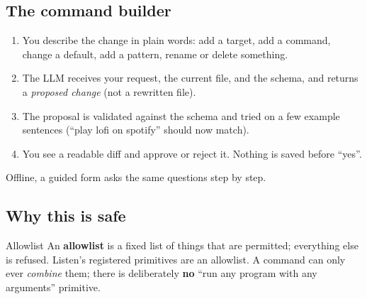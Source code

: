 \documentclass[11pt,a4paper]{article}
\begin{document}
\subsection{The command builder}
\begin{center}
\end{center}

\begin{enumerate}[nosep]
  \item You describe the change in plain words: add a target, add a command, change a default,
        add a pattern, rename or delete something.
  \item The LLM receives your request, the current file, and the schema, and returns a
        \emph{proposed change} (not a rewritten file).
  \item The proposal is validated against the schema and tried on a few example sentences
        (``play lofi on spotify'' should now match).
  \item You see a readable diff and approve or reject it. Nothing is saved before ``yes''.
\end{enumerate}

\noindent Offline, a guided form asks the same questions step by step.

\subsection{Why this is safe}
\begin{concept}{Allowlist}
An \textbf{allowlist} is a fixed list of things that are permitted; everything else is
refused. Listen's registered primitives are an allowlist. A command can only ever \emph{combine}
them; there is deliberately \textbf{no} ``run any program with any arguments'' primitive.
\end{concept}
\end{document}
